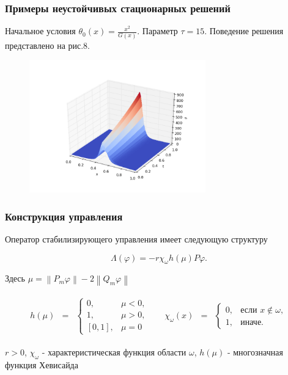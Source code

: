 \documentclass{beamer}
\newcommand{\norm}[1]{\left\lVert#1\right\rVert}
\begin{document}
\begin{frame}
\frametitle{Примеры неустойчивых стационарных решений}

Начальное условия $\theta_0(x) = \frac{x^2}{G(x)}$. Параметр $\tau = 15$.
Поведение решения представлено на рис.8.

\begin{figure}[H]
    \centering
    \includegraphics[width=3in]{ex_x2_s15}
    \caption{}
\end{figure}

\end{frame}

\begin{frame}
\frametitle{Конструкция управления}

Оператор стабилизирующего управления имеет следующую структуру

\begin{block}{}
\begin{equation}
    \Lambda(\varphi) = -r \chi_{\omega}h(\mu)P\varphi.
\end{equation}
\end{block}

Здесь $\mu = \norm{P_m\varphi} - 2 \norm{Q_m\varphi}$

\begin{block}{}
\begin{gather*}
    \begin{matrix}
        h(\mu) & =
        & \left\{
        \begin{matrix}
            0, & \mu < 0, \\
            1, & \mu > 0, \\
            [0, 1], & \mu = 0
        \end{matrix} \right.
    \end{matrix} \quad
    \begin{matrix}
        \chi_{\omega}(x) & =
        & \left\{
        \begin{matrix}
            0, & \mbox{если } x \notin \omega, \\
            1, & \mbox{иначе. }
        \end{matrix} \right.
    \end{matrix}
\end{gather*}
\end{block}
$r > 0$, $\chi_{\omega}$ - характеристическая функция области $\omega$,
$h(\mu)$ - многозначная функция Хевисайда\\

\end{frame}
\end{document}
